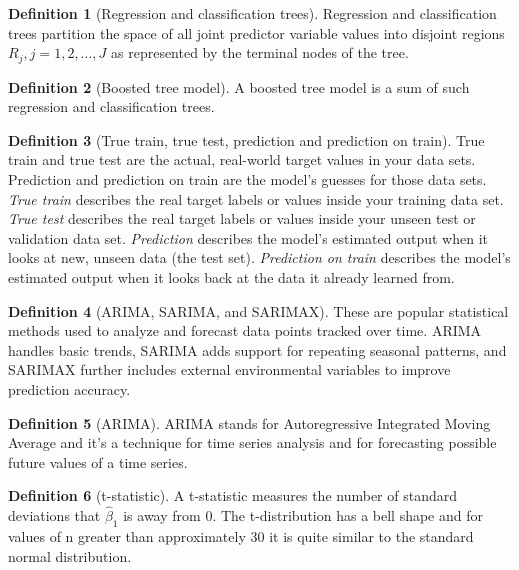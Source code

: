 \documentclass{article}
\theoremstyle{definition}
\newtheorem{definition}{Definition}
\theoremstyle{Solution}
\begin{document}
\begin{definition}[Regression and classification trees]
Regression and classification trees partition the space of all joint predictor variable values into disjoint regions $R_j,j =1,2,...,J$ as represented by the terminal nodes of the tree.
\end{definition}

\begin{definition}[Boosted tree model]
A boosted tree model is a sum of such regression and classification trees.
\end{definition}

\begin{definition}[True train, true test, prediction and prediction on train]
True train and true test are the actual, real-world target values in your data sets. Prediction and prediction on train are the model's guesses for those data sets. \textit{True train} describes the real target labels or values inside your training data set. \textit{True test} describes the real target labels or values inside your unseen test or validation data set. \textit{Prediction} describes the model's estimated output when it looks at new, unseen data (the test set). \textit{Prediction on train} describes the model's estimated output when it looks back at the data it already learned from.
\end{definition}

\begin{definition}[ARIMA, SARIMA, and SARIMAX]
These are popular statistical methods used to analyze and forecast data points tracked over time. ARIMA handles basic trends, SARIMA adds support for repeating seasonal patterns, and SARIMAX further includes external environmental variables to improve prediction accuracy.
\end{definition}

\begin{definition}[ARIMA]
ARIMA stands for Autoregressive Integrated Moving Average and it's a technique for time series analysis and for forecasting possible future values of a time series.
\end{definition}

\begin{definition}[t-statistic]
A t-statistic measures the number of standard deviations that $\hat{\beta}_1$ is away from $0$. The t-distribution has a bell shape and for values of n greater than approximately 30 it is quite similar to the standard normal distribution.
\end{definition}
\end{document}
